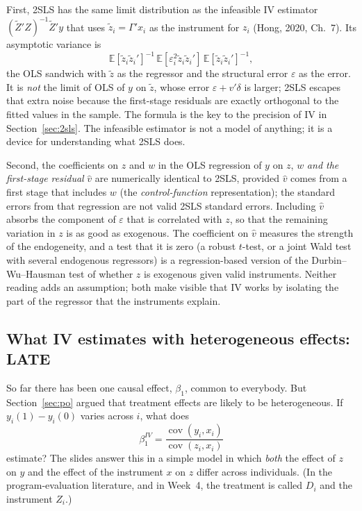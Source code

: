 \documentclass[11pt,a4paper]{article}
\newcommand{\E}{\mathbb{E}}
\newcommand{\Cov}{\operatorname{cov}}
\begin{document}
First, 2SLS has the same limit distribution as the infeasible IV estimator $(\tilde Z'Z)^{-1}\tilde Z'y$ that uses $\tilde z_i=\Gamma'x_i$ as the instrument for $z_i$ (Hong, 2020, Ch.~7). Its asymptotic variance is
\[
\E[\tilde z_i\tilde z_i']^{-1}\,\E[\varepsilon_i^2\tilde z_i\tilde z_i']\,\E[\tilde z_i\tilde z_i']^{-1},
\]
the OLS sandwich with $\tilde z$ as the regressor and the structural error $\varepsilon$ as the error. It is \emph{not} the limit of OLS of $y$ on $\tilde z$, whose error $\varepsilon+v'\delta$ is larger; 2SLS escapes that extra noise because the first-stage residuals are exactly orthogonal to the fitted values in the sample. The formula is the key to the precision of IV in Section~\ref{sec:2sls}. The infeasible estimator is not a model of anything; it is a device for understanding what 2SLS does.

Second, the coefficients on $z$ and $w$ in the OLS regression of $y$ on $z$, $w$ \emph{and the first-stage residual} $\hat v$ are numerically identical to 2SLS, provided $\hat v$ comes from a first stage that includes $w$ (the \emph{control-function} representation); the standard errors from that regression are not valid 2SLS standard errors. Including $\hat v$ absorbs the component of $\varepsilon$ that is correlated with $z$, so that the remaining variation in $z$ is as good as exogenous. The coefficient on $\hat v$ measures the strength of the endogeneity, and a test that it is zero (a robust $t$-test, or a joint Wald test with several endogenous regressors) is a regression-based version of the Durbin--Wu--Hausman test of whether $z$ is exogenous given valid instruments. Neither reading adds an assumption; both make visible that IV works by isolating the part of the regressor that the instruments explain.

\subsection{What IV estimates with heterogeneous effects: LATE}\label{sec:late}

So far there has been one causal effect, $\beta_1$, common to everybody. But Section~\ref{sec:po} argued that treatment effects are likely to be heterogeneous. If $y_i(1)-y_i(0)$ varies across $i$, what does
\[
\beta_1^{IV}=\frac{\Cov(y_i,x_i)}{\Cov(z_i,x_i)}
\]
estimate? The slides answer this in a simple model in which \emph{both} the effect of $z$ on $y$ and the effect of the instrument $x$ on $z$ differ across individuals. (In the program-evaluation literature, and in Week~4, the treatment is called $D_i$ and the instrument $Z_i$.)
\end{document}
